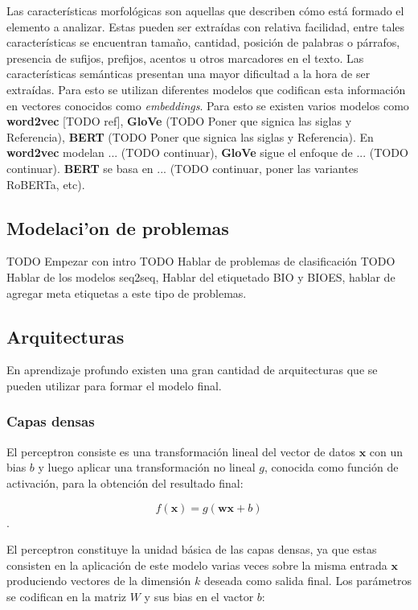 Las características morfológicas son aquellas que describen cómo está formado el elemento a analizar.
Estas pueden ser extraídas con relativa facilidad, entre tales características se encuentran tamaño, 
cantidad, posición de palabras o párrafos, presencia de sufijos, prefijos, acentos u otros marcadores
en el texto. Las características semánticas presentan una mayor dificultad a la hora de ser extraídas.
Para esto se utilizan diferentes modelos que codifican esta información en vectores conocidos como 
\emph{embeddings}. Para esto se existen varios modelos 
como \textbf{word2vec} [TODO ref], \textbf{GloVe} (TODO Poner que signica las siglas y Referencia), \textbf{BERT}
(TODO Poner que signica las siglas y Referencia).
En \textbf{word2vec} modelan ... (TODO continuar), \textbf{GloVe}
sigue el enfoque de ... (TODO continuar). \textbf{BERT} se basa en ... (TODO continuar, poner las variantes RoBERTa, etc).

\subsection{Modelaci'on de problemas}

TODO Empezar con intro
TODO Hablar de problemas de clasificación
TODO Hablar de los modelos seq2seq, Hablar del etiquetado BIO y BIOES, hablar de agregar meta etiquetas a este 
tipo de problemas.


\subsection{Arquitecturas}

En aprendizaje profundo existen una gran cantidad de arquitecturas que se pueden utilizar para formar el modelo 
final.

\subsubsection{Capas densas}

El perceptron consiste es una transformación lineal del vector de datos $\textbf{x}$ con un bias $b$ y 
luego aplicar una transformación no lineal $g$, conocida como función de activación, 
para la obtención del resultado final:

\begin{equation}
	f(\textbf{x}) = g(\textbf{w}\textbf{x} + b)
\end{equation}\label{eq:perceptron}.

El perceptron constituye la unidad básica de las capas densas, ya que estas consisten en la aplicación
de este modelo varias veces sobre la misma entrada $\textbf{x}$ produciendo vectores de la dimensión $k$ 
deseada como salida final. Los parámetros se codifican en la matriz $W$ y sus bias en el vactor $b$:

